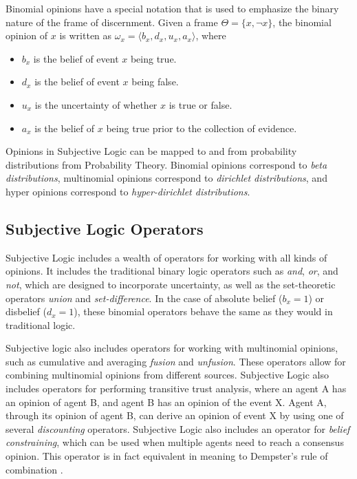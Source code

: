 \documentclass[thesis.tex]{subfiles}
\begin{document}
Binomial opinions have a special notation that is used to emphasize the binary nature of the frame of
discernment. Given a frame $\Theta = \lbrace x, \lnot x \rbrace$, the binomial opinion of $x$ is written
as $\omega_x = \langle b_x, d_x, u_x, a_x \rangle$, where

\begin{itemize}
  \item $b_x$ is the belief of event $x$ being true.
  \item $d_x$ is the belief of event $x$ being false.
  \item $u_x$ is the uncertainty of whether $x$ is true or false.
  \item $a_x$ is the belief of $x$ being true prior to the collection of evidence.
\end{itemize}

Opinions in Subjective Logic can be mapped to and from probability distributions from Probability
Theory. Binomial opinions correspond to \emph{beta distributions}, multinomial opinions correspond
to \emph{dirichlet distributions}, and hyper opinions correspond to \emph{hyper-dirichlet distributions}.


\subsection{Subjective Logic Operators}

Subjective Logic includes a wealth of operators for working with all kinds of opinions. It includes
the traditional binary logic operators such as \emph{and}, \emph{or}, and \emph{not}, which are
designed to incorporate uncertainty, as well as the set-theoretic operators \emph{union} and
\emph{set-difference}. In the case of absolute belief ($b_x = 1$) or disbelief ($d_x =1$), these
binomial operators behave the same as they would in traditional logic.

Subjective logic also includes operators for working with multinomial opinions, such as
cumulative and averaging \emph{fusion} and \emph{unfusion}. These operators allow for combining
multinomial opinions from different sources. Subjective Logic also includes operators for performing
transitive trust analysis, where an agent A has an opinion of agent B, and agent B has an opinion of
the event X. Agent A, through its opinion of agent B, can derive an opinion of event X by using one
of several \emph{discounting} operators. Subjective Logic also includes an operator for
\emph{belief constraining}, which can be used when multiple agents need to reach a consensus opinion.
This operator is in fact equivalent in meaning to Dempster's rule of combination \cite{josang2012dempster}.
\end{document}
